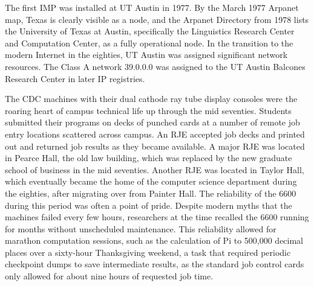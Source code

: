The first IMP was installed at UT Austin in 1977. By the March 1977 Arpanet map, Texas is clearly visible as a node, and the Arpanet Directory from 1978 lists the University of Texas at Austin, specifically the Linguistics Research Center and Computation Center, as a fully operational node. In the transition to the modern Internet in the eighties, UT Austin was assigned significant network resources. The Class A network 39.0.0.0 was assigned to the UT Austin Balcones Research Center in later IP registries.

The CDC machines with their dual cathode ray tube display consoles were the roaring heart of campus technical life up through the mid seventies. Students submitted their programs on decks of punched cards at a number of remote job entry locations scattered across campus. An RJE accepted job decks and printed out and returned job results as they became available. A major RJE was located in Pearce Hall, the old law building, which was replaced by the new graduate school of business in the mid seventies. Another RJE was located in Taylor Hall, which eventually became the home of the computer science department during the eighties, after migrating over from Painter Hall. The reliability of the 6600 during this period was often a point of pride. Despite modern myths that the machines failed every few hours, researchers at the time recalled the 6600 running for months without unscheduled maintenance. This reliability allowed for marathon computation sessions, such as the calculation of Pi to 500,000 decimal places over a sixty-hour Thanksgiving weekend, a task that required periodic checkpoint dumps to save intermediate results, as the standard job control cards only allowed for about nine hours of requested job time.
